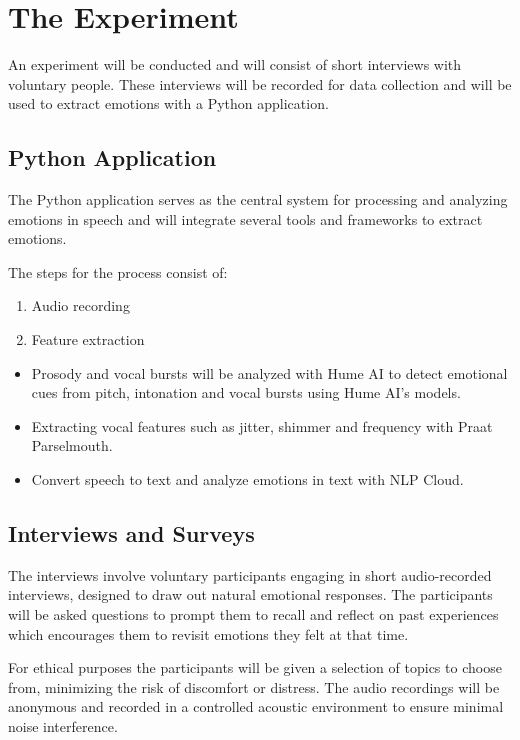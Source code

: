 \section{The Experiment}

An experiment will be conducted and will consist of short interviews with voluntary people. These interviews will be recorded for data collection and will be used to extract emotions with a Python application. 

\subsection{Python Application}

The Python application serves as the central system for processing and analyzing emotions in speech and will integrate several tools and frameworks to extract emotions.

The steps for the process consist of:

\begin{enumerate}
    \item Audio recording
    \item Feature extraction
\end{enumerate}

\begin{itemize}
    \item Prosody and vocal bursts will be analyzed with Hume AI to detect emotional cues from pitch, intonation and vocal bursts using Hume AI’s models.
    \item Extracting vocal features such as jitter, shimmer and frequency with Praat Parselmouth.
    \item Convert speech to text and analyze emotions in text with NLP Cloud.
\end{itemize}


\subsection{Interviews and Surveys}
\label{sec:theo-interviews}

The interviews involve voluntary participants engaging in short audio-recorded interviews, designed to draw out natural emotional responses. The participants will be asked questions to prompt them to recall and reflect on past experiences which encourages them to revisit emotions they felt at that time. 

For ethical purposes the participants will be given a selection of topics to choose from, minimizing the risk of discomfort or distress. The audio recordings will be anonymous and recorded in a controlled acoustic environment to ensure minimal noise interference.

